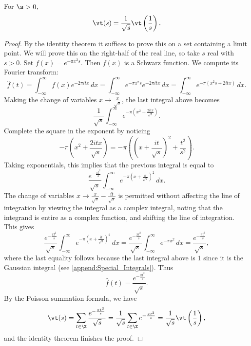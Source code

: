       \begin{theorem}
        For $\s > 0$,
        \[
          \vt(s) = \frac{1}{\sqrt{s}}\vt\left(\frac{1}{s}\right).
        \]
      \end{theorem}
      \begin{proof}
        By the identity theorem it suffices to prove this on a set containing a limit point. We will prove this on the right-half of the real line, so take $s$ real with $s > 0$. Set $f(x) = e^{-\pi x^{2}s}$. Then $f(x)$ is a Schwarz function. We compute its Fourier transform:
        \[
          \hat{f}(t) = \int_{-\infty}^{\infty}f(x)e^{-2\pi itx}\,dx = \int_{-\infty}^{\infty}e^{-\pi x^{2}s}e^{-2\pi itx}\,dx = \int_{-\infty}^{\infty}e^{-\pi(x^{2}s+2itx)}\,dx.
        \]
        Making the change of variables $x \to \frac{x}{\sqrt{s}}$, the last integral above becomes
        \[
          \frac{1}{\sqrt{s}}\int_{-\infty}^{\infty}e^{-\pi\left(x^{2}+\frac{2itx}{\sqrt{s}}\right)}.
        \]
        Complete the square in the exponent by noticing
        \[
          -\pi\left(x^{2}+\frac{2itx}{\sqrt{s}}\right) = -\pi\left(\left(x+\frac{it}{\sqrt{s}}\right)^{2}+\frac{t^{2}}{s^{2}}\right).
        \]
        Taking exponentials, this implies that the previous integral is equal to
        \[
          \frac{e^{-\frac{\pi t^{2}}{s}}}{\sqrt{s}}\int_{-\infty}^{\infty}e^{-\pi\left(x+\frac{it}{\sqrt{s}}\right)^{2}}\,dx.
        \]
        The change of variables $x \to \frac{x}{\sqrt{s}}-\frac{it}{\sqrt{s}}$ is permitted without affecting the line of integration by viewing the integral as a complex integral, noting that the integrand is entire as a complex function, and shifting the line of integration. This gives
        \[
          \frac{e^{-\frac{\pi t^{2}}{s}}}{\sqrt{s}}\int_{-\infty}^{\infty}e^{-\pi\left(x+\frac{it}{\sqrt{s}}\right)^{2}}\,dx = \frac{e^{-\frac{\pi t^{2}}{s}}}{\sqrt{s}}\int_{-\infty}^{\infty}e^{-\pi x^{2}}\,dx = \frac{e^{-\frac{\pi t^{2}}{s}}}{\sqrt{s}},
        \]
        where the last equality follows because the last integral above is $1$ since it is the Gaussian integral (see \cref{append:Special_Integrals}). Thus
        \[
          \hat{f}(t) = \frac{e^{-\frac{\pi t^{2}}{s}}}{\sqrt{s}}.
        \]
        By the Poisson summation formula, we have
        \[
          \vt(s) = \sum_{t \in \Z}\frac{e^{-\frac{\pi t^{2}}{s}}}{\sqrt{s}} = \frac{1}{\sqrt{s}}\sum_{t \in \Z}e^{-\frac{\pi t^{2}}{s}} = \frac{1}{\sqrt{s}}\vt\left(\frac{1}{s}\right),
        \]
        and the identity theorem finishes the proof.
      \end{proof}

